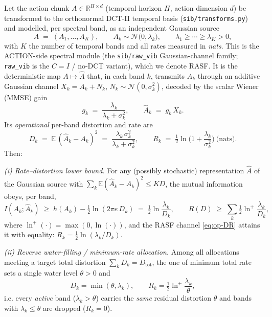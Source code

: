 \begin{theorem}
\label{thm:rasf-waterfill}
Let the action chunk $A\in\mathbb R^{H\times d}$ (temporal horizon $H$, action dimension $d$) be transformed to the orthonormal DCT-II temporal basis (\texttt{sib/transforms.py}) and modelled, per spectral band, as an independent Gaussian source
\[
A \;=\; (A_1,\dots,A_K), \qquad A_k \sim \mathcal N\!\big(0,\lambda_k\big),\qquad \lambda_1\ge\cdots\ge\lambda_K>0,
\]
with $K$ the number of temporal bands and all rates measured in \emph{nats}. This is the ACTION-side spectral module (the \texttt{sib}/\texttt{raw\_vib} Gaussian-channel family; \texttt{raw\_vib} is the $C=I$ / no-DCT variant), which we denote RASF. It is the deterministic map $A\mapsto \hat A$ that, in each band $k$, transmits $A_k$ through an additive Gaussian channel $X_k = A_k + N_k$, $N_k\sim\mathcal N(0,\sigma_k^2)$, decoded by the scalar Wiener (MMSE) gain
\[
g_k \;=\; \frac{\lambda_k}{\lambda_k+\sigma_k^2},\qquad \hat A_k \;=\; g_k\,X_k .
\]
Its \emph{operational} per-band distortion and rate are
\begin{equation}
D_k \;=\; \mathbb E\,(\hat A_k-A_k)^2 \;=\; \frac{\lambda_k\,\sigma_k^2}{\lambda_k+\sigma_k^2},
\qquad
R_k \;=\; \tfrac12\ln\!\Big(1+\frac{\lambda_k}{\sigma_k^2}\Big)\ \text{(nats).}
\label{eq:op-DR}
\end{equation}
Then:

\emph{(i) Rate--distortion lower bound.} For any (possibly stochastic) representation $\hat A$ of the Gaussian source with $\sum_k \mathbb E(\hat A_k-A_k)^2 \le KD$, the mutual information obeys, per band,
\begin{equation}
I(A_k;\hat A_k)\;\ge\; h(A_k)-\tfrac12\ln(2\pi e\,D_k)\;=\;\tfrac12\ln\!\frac{\lambda_k}{D_k},
\qquad
R(D)\;\ge\;\sum_k \tfrac12\ln^{+}\!\frac{\lambda_k}{D_k},
\label{eq:rd-lb}
\end{equation}
where $\ln^{+}(\cdot)=\max(0,\ln(\cdot))$, and the RASF channel \eqref{eq:op-DR} attains it with equality: $R_k=\tfrac12\ln(\lambda_k/D_k)$.

\emph{(ii) Reverse water-filling / minimum-rate allocation.} Among all allocations meeting a target total distortion $\sum_k D_k = D_{\mathrm{tot}}$, the one of minimum total rate sets a single water level $\theta>0$ and
\begin{equation}
D_k=\min(\theta,\lambda_k),\qquad
R_k=\tfrac12\ln^{+}\!\frac{\lambda_k}{\theta},
\label{eq:rwf}
\end{equation}
i.e. every \emph{active} band ($\lambda_k>\theta$) carries the \emph{same} residual distortion $\theta$ and bands with $\lambda_k\le\theta$ are dropped ($R_k=0$).


\end{theorem}
